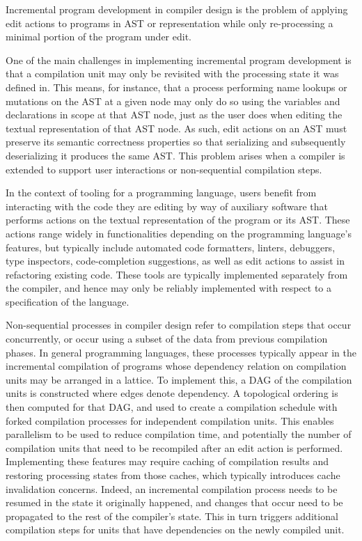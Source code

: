 Incremental program development in compiler design is the problem of applying edit actions to programs in \ac{AST} or representation while only re-processing a minimal portion of the program under edit.

One of the main challenges in implementing incremental program development is that a compilation unit may only be revisited with the processing state it was defined in.
This means, for instance, that a process performing name lookups or mutations on the \ac{AST} at a given node may only do so using the variables and declarations in scope at that \ac{AST} node, just as the user does when editing the textual representation of that \ac{AST} node.
As such, edit actions on an \ac{AST} must preserve its semantic correctness properties so that serializing and subsequently deserializing it produces the same \ac{AST}.
This problem arises when a compiler is extended to support user interactions or non-sequential compilation steps.

In the context of tooling for a programming language, users benefit from interacting with the code they are editing by way of auxiliary software that performs actions on the textual representation of the program or its \ac{AST}.
These actions range widely in functionalities depending on the programming language's features, but typically include automated code formatters, linters, debuggers, type inspectors, code-completion suggestions, as well as edit actions to assist in refactoring existing code.
These tools are typically implemented separately from the compiler, and hence may only be reliably implemented with respect to a specification of the language.


Non-sequential processes in compiler design refer to compilation steps that occur concurrently, or occur using a subset of the data from previous compilation phases.
In general programming languages, these processes typically appear in the incremental compilation of programs whose dependency relation on compilation units may be arranged in a lattice.
To implement this, a \ac{DAG} of the compilation units is constructed where edges denote dependency.
A topological ordering is then computed for that \ac{DAG}, and used to create a compilation schedule with forked compilation processes for independent compilation units.
This enables parallelism to be used to reduce compilation time, and potentially the number of compilation units that need to be recompiled after an edit action is performed.
Implementing these features may require caching of compilation results and restoring processing states from those caches, which typically introduces cache invalidation concerns.
Indeed, an incremental compilation process needs to be resumed in the state it originally happened, and changes that occur need to be propagated to the rest of the compiler's state.
This in turn triggers additional compilation steps for units that have dependencies on the newly compiled unit.

